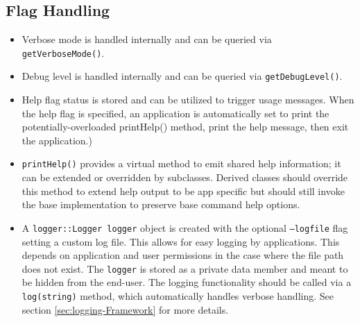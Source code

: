 \subsection*{Flag Handling}
\begin{itemize}\itemsep0em
	\item Verbose mode is handled internally and can be queried via \texttt{getVerboseMode()}.
	\item Debug level is handled internally and can be queried via \texttt{getDebugLevel()}.
	\item Help flag status is stored and can be utilized to trigger usage messages. When the help flag is specified, an application is automatically set to print the potentially-overloaded printHelp() method, print the help message, then exit the application.)
	\item \texttt{printHelp()} provides a virtual method to emit shared help information; it can be extended or overridden by subclasses. Derived classes should override this method to extend help output to be app specific but should still invoke the base implementation to preserve base command help options.
	\item A \texttt{logger::Logger logger} object is created with the optional \texttt{--logfile} flag setting a custom log file. This allows for easy logging by applications. This depends on application and user permissions in the case where the file path does not exist. The \texttt{logger} is stored as a private data member and meant to be hidden from the end-user. The logging functionality should be called via a \texttt{log(string)} method, which automatically handles verbose handling. See section \ref{sec:logging-Framework} for more details.
\end{itemize}

